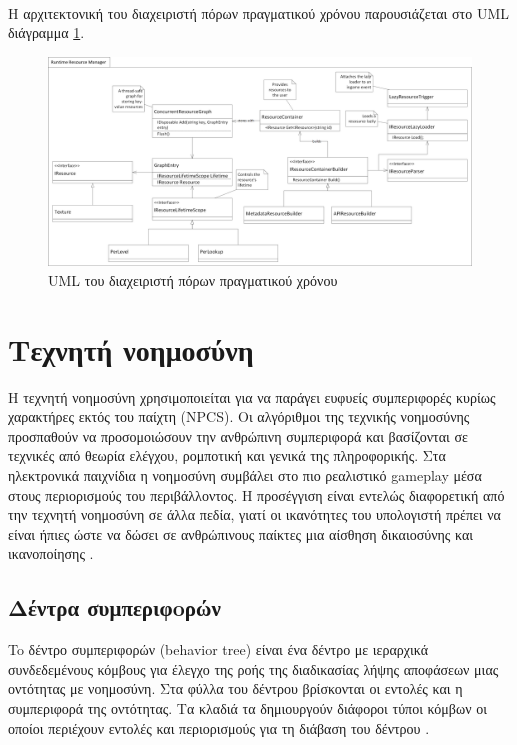 \\Η αρχιτεκτονική του διαχειριστή πόρων πραγματικού χρόνου παρουσιάζεται στο \gls{UML} διάγραμμα \ref{fig:runtime_resource_uml}.
\begin{figure}[h!]
	\centering
	\includegraphics[width=165mm]{Images/runtime_resource_manager}
	\caption{UML του διαχειριστή πόρων πραγματικού χρόνου}
	\label{fig:runtime_resource_uml}
\end{figure}

\section{Τεχνητή νοημοσύνη}
Η τεχνητή νοημοσύνη χρησιμοποιείται για να παράγει ευφυείς συμπεριφορές κυρίως χαρακτήρες εκτός του παίχτη (NPCS). Οι αλγόριθμοι της τεχνικής νοημοσύνης προσπαθούν να προσομοιώσουν την ανθρώπινη συμπεριφορά και βασίζονται σε τεχνικές από θεωρία ελέγχου, ρομποτική και γενικά της πληροφορικής. Στα ηλεκτρονικά παιχνίδια η νοημοσύνη συμβάλει στο πιο ρεαλιστικό gameplay μέσα στους περιορισμούς του περιβάλλοντος. Η προσέγγιση είναι εντελώς διαφορετική από την τεχνητή νοημοσύνη σε άλλα πεδία, γιατί οι ικανότητες του υπολογιστή πρέπει να είναι ήπιες ώστε να δώσει σε ανθρώπινους παίκτες μια αίσθηση δικαιοσύνης και ικανοποίησης \cite{Sousa:2002:GPO:580160}.
 
\subsection{Δέντρα συμπεριφoρών}	
To δέντρο συμπεριφορών (behavior tree) είναι ένα δέντρο με ιεραρχικά συνδεδεμένους κόμβους για έλεγχο της ροής της διαδικασίας λήψης αποφάσεων μιας οντότητας με νοημοσύνη. Στα φύλλα του δέντρου βρίσκονται οι εντολές και η συμπεριφορά της οντότητας. Τα κλαδιά τα δημιουργούν διάφοροι τύποι κόμβων οι οποίοι περιέχουν εντολές και περιορισμούς για τη διάβαση του δέντρου \cite{champandard2007understanding}.

